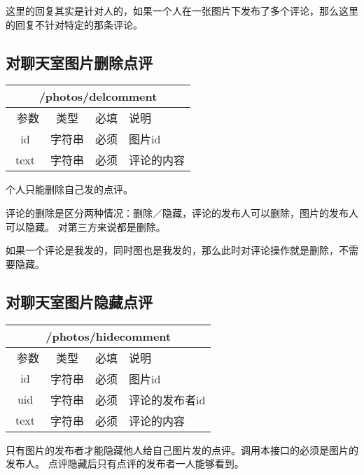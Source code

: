 \documentclass[cs4size]{ctexartutf8}
\begin{document}
这里的回复其实是针对人的，如果一个人在一张图片下发布了多个评论，那么这里的回复不针对特定的那条评论。


\subsection{对聊天室图片删除点评}

\begin{table}[H]
   \begin{center}
\begin{tabular}{|c|c|c|p{12cm}|}
\hline
\multicolumn{4}{|c|}{/photos/delcomment} \\
\hline\hline
 \  参数  & 类型 & 必填 &  说明  \\
  \hline
 id  & 字符串 & 必须 & 图片id\\
  \hline
 text  & 字符串 & 必须 & 评论的内容\\
\hline
\end{tabular}
   \end{center}
\end{table}
个人只能删除自己发的点评。

评论的删除是区分两种情况：删除／隐藏，评论的发布人可以删除，图片的发布人可以隐藏。
对第三方来说都是删除。

如果一个评论是我发的，同时图也是我发的，那么此时对评论操作就是删除，不需要隐藏。


\subsection{对聊天室图片隐藏点评}

\begin{table}[H]
   \begin{center}
\begin{tabular}{|c|c|c|p{12cm}|}
\hline
\multicolumn{4}{|c|}{/photos/hidecomment} \\
\hline\hline
 \  参数  & 类型 & 必填 &  说明  \\
  \hline
 id  & 字符串 & 必须 & 图片id\\
  \hline
 uid  & 字符串 & 必须 & 评论的发布者id\\
   \hline
 text  & 字符串 & 必须 & 评论的内容\\
\hline
\end{tabular}
   \end{center}
\end{table}
只有图片的发布者才能隐藏他人给自己图片发的点评。调用本接口的必须是图片的发布人。
点评隐藏后只有点评的发布者一人能够看到。
\end{document}
